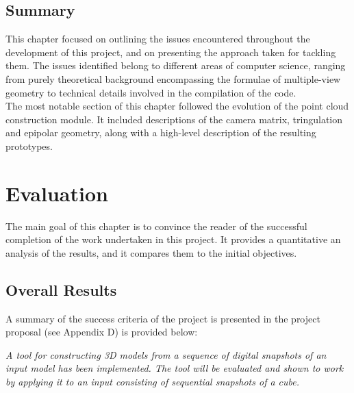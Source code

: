 \documentclass[12pt,a4paper,twoside,openright]{report}
\begin{document}
\section{Summary} 
This chapter focused on outlining the issues encountered throughout the development of this project, and on presenting the approach taken for tackling them. The issues identified belong to different areas of computer science, ranging from purely theoretical background encompassing the formulae of multiple-view geometry to technical details involved in the compilation of the code. \\
\linebreak
The most notable section of this chapter followed the evolution of the point cloud construction module. It included descriptions of the camera matrix, tringulation and epipolar geometry, along with a high-level description of the resulting prototypes.

\chapter{Evaluation}
The main goal of this chapter is to convince the reader of the successful completion of the work undertaken in this project. It provides a quantitative an analysis of the results, and it compares them to the initial objectives.  

\section{Overall Results}
A summary of the success criteria of the project is presented in the project proposal (see Appendix D) is provided below:\\
\linebreak
\begin{adjustwidth}{0.7cm}{}
\emph{A tool for constructing 3D models from a sequence of digital snapshots of an input model has been implemented. The tool will be evaluated
and shown to work by applying it to an input consisting of sequential snapshots of a cube.}\\
\linebreak
\end{adjustwidth} 
\end{document}
